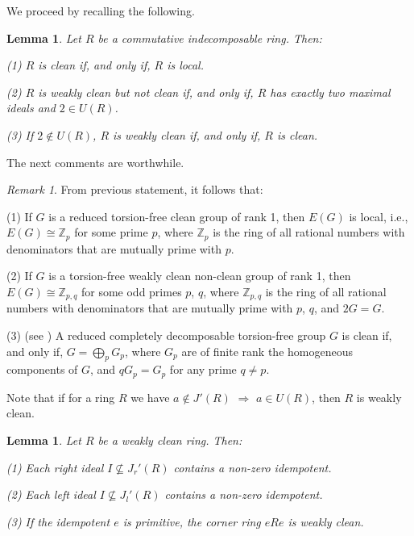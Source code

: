 \documentclass{amsart}
\newtheorem{lemma}[theorem]{Lemma}
\theoremstyle{definition}
\theoremstyle{remark}
\newtheorem{remark}[theorem]{Remark}
\numberwithin{equation}{section}
\begin{document}
We proceed by recalling the following.

\begin{lemma} \cite[Lemma 2.1]{LZ}
Let $R$ be a commutative indecomposable ring. Then:

(1) $R$ is clean if, and only if, $R$ is local.

(2) $R$ is weakly clean but not clean if, and only if, $R$ has exactly two maximal ideals and $2\in U(R)$.

(3) If $2\not\in U(R)$, $R$ is weakly clean if, and only if, $R$ is clean.
\end{lemma}

The next comments are worthwhile.

\begin{remark}\label{comments}
From previous statement, it follows that:

(1) If $G$ is a reduced torsion-free clean group of rank 1, then $E(G)$ is local, i.e., $E(G)\cong\mathbb{Z}_p$
for some prime $p$, where $\mathbb{Z}_p$ is the ring of all rational numbers with denominators that are mutually prime with $p$.

(2) If $G$ is a torsion-free weakly clean non-clean group of rank 1, then $E(G)\cong\mathbb{Z}_{p,q}$ for some odd primes $p$, $q$, where $\mathbb{Z}_{p,q}$ is the ring of all rational numbers with denominators that are mutually prime with $p$, $q$, and $2G=G$.

(3) (see \cite{S}) A reduced completely decomposable torsion-free group $G$ is clean if, and only if, $G=\bigoplus_p G_p$, where $G_p$ are of finite rank the homogeneous components of $G$, and $qG_p=G_p$ for any prime $q\neq p$.
\end{remark}

Note that if for a ring $R$ we have $a\not\in J'(R)$ $\Rightarrow$ $a\in U(R)$, then $R$ is weakly clean.

\begin{lemma}
Let $R$ be a weakly clean ring. Then:

(1) Each right ideal $I\nsubseteq J_r'(R)$ contains a non-zero idempotent.

(2) Each left ideal $I\nsubseteq J_l'(R)$ contains a non-zero idempotent.

(3) If the idempotent $e$ is primitive, the corner ring $eRe$ is weakly clean.
\end{lemma}
\end{document}
